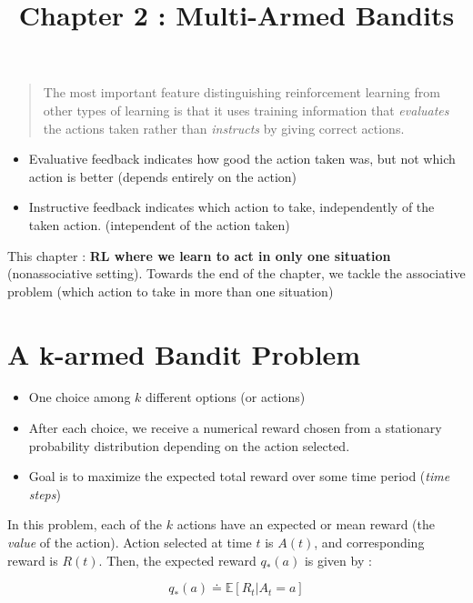 \documentclass{article}
\begin{document}
\title{Chapter 2 : Multi-Armed Bandits}
\maketitle


\begin{quote}
	The most important feature distinguishing reinforcement learning from other types of learning is that it uses training information that \textit{evaluates} the actions taken rather than \textit{instructs} by giving correct actions.
\end{quote}

\begin{itemize}
	\item Evaluative feedback indicates how good the action taken was, but not which action is better (depends entirely on the action)
	\item Instructive feedback indicates which action to take, independently of the taken action. (intependent of the action taken)
\end{itemize}

This chapter : \textbf{RL where we learn to act in only one situation} (nonassociative setting). Towards the end of the chapter, we tackle the associative problem (which action to take in more than one situation)

\section{A k-armed Bandit Problem}

\begin{itemize}
	\item One choice among $k$ different options (or actions)
	\item After each choice, we receive a numerical reward chosen from a stationary probability distribution depending on the action selected.
	\item Goal is to maximize the expected total reward over some time period (\textit{time steps})
\end{itemize}

In this problem, each of the $k$ actions have an expected or mean reward (the \textit{value} of the action). Action selected at time $t$ is $A(t)$, and corresponding reward is $R(t)$. Then, the expected reward $q_*(a)$ is given by :

\begin{equation}
q_*(a) \doteq \mathbb{E}\left[ R_t | A_t = a \right]
\end{equation}
\end{document}
